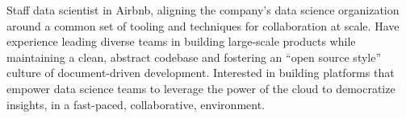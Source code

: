 \documentclass[11pt, letterpaper]{awesome-cv}
\begin{document}
\makecvheader






\begin{cvparagraph}
Staff data scientist in Airbnb, aligning the company's data science organization around a common set of tooling and techniques for collaboration at scale.
Have experience leading diverse teams in building large-scale products while maintaining a clean, abstract codebase and fostering an ``open source style'' culture of document-driven development.
Interested in building platforms that empower data science teams to leverage the power of the cloud to democratize insights, in a fast-paced, collaborative, environment.
\end{cvparagraph}





\end{document}
